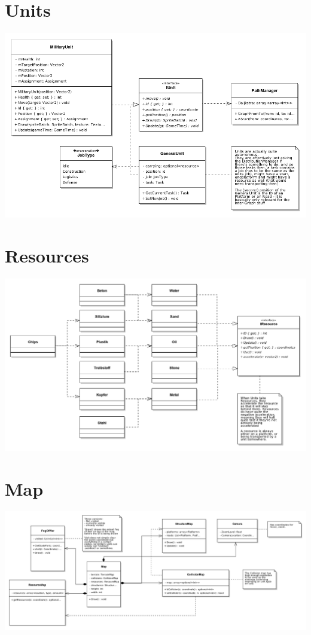 \documentclass[12pt]{article}
\begin{document}
\section{Units}
\includegraphics[width=\textwidth]{Units}
\newline

\section{Resources}
\includegraphics[width=\textwidth]{Resources}
\newline

\section{Map}
\includegraphics[width=\textwidth]{Map}
\newline
\end{document}
